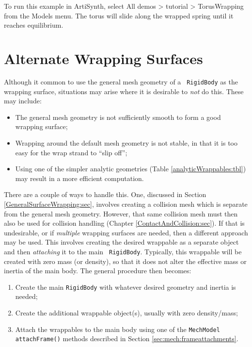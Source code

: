 To run this example in ArtiSynth, select {\sf All demos > tutorial >
TorusWrapping} from the {\sf Models} menu. The torus will slide along
the wrapped spring until it reaches equilibrium.

\section{Alternate Wrapping Surfaces}
\label{AlternateWrappingSurfaces:sec}

Although it common to use the general mesh geometry of a {\tt
RigidBody} as the wrapping surface, situations may arise where it is
desirable to {\it not} do this. These may include:

\begin{itemize}

\item The general mesh geometry is not sufficiently smooth
to form a good wrapping surface;

\item Wrapping around the default mesh geometry is not stable, in
that it is too easy for the wrap strand to ``slip off'';

\item Using one of the simpler analytic geometries
(Table \ref{analyticWrappables:tbl}) may result in a more efficient
computation.

\end{itemize}

There are a couple of ways to handle this. One, discussed in Section
\ref{GeneralSurfaceWrapping:sec}, involves creating a collision mesh
which is separate from the general mesh geometry. However, that same
collision mesh must then also be used for collision handling (Chapter
\ref{ContactAndCollision:sec}). If that is undesirable, or if {\it
multiple} wrapping surfaces are needed, then a different approach may
be used. This involves creating the desired wrappable as a separate
object and then {\it attaching} it to the main {\tt
RigidBody}. Typically, this wrappable will be created with zero mass
(or density), so that it does not alter the effective mass or inertia
of the main body. The general procedure then becomes:

\begin{enumerate}

\item Create the main {\tt RigidBody} with whatever desired geometry
and inertia is needed;

\item Create the additional wrappable object(s), usually
with zero density/mass;

\item Attach the wrappables to the main body using
one of the {\tt MechModel} {\tt attachFrame()} methods described in
Section \ref{sec:mech:frameattachments}.

\end{enumerate}

